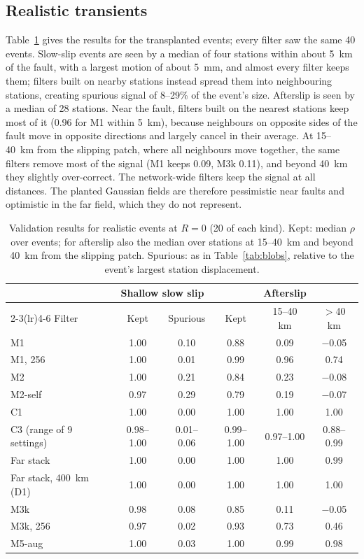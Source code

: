 \documentclass[11pt,a4paper]{article}
\begin{document}
\subsection{Realistic transients}

Table~\ref{tab:events} gives the results for the transplanted events; every filter saw the same 40 events. Slow-slip events are seen by a median of four stations within about 5~km of the fault, with a largest motion of about 5~mm, and almost every filter keeps them; filters built on nearby stations instead spread them into neighbouring stations, creating spurious signal of 8--29\% of the event's size. Afterslip is seen by a median of 28 stations. Near the fault, filters built on the nearest stations keep most of it (0.96 for M1 within 5~km), because neighbours on opposite sides of the fault move in opposite directions and largely cancel in their average. At 15--40~km from the slipping patch, where all neighbours move together, the same filters remove most of the signal (M1 keeps 0.09, M3k 0.11), and beyond 40~km they slightly over-correct. The network-wide filters keep the signal at all distances. The planted Gaussian fields are therefore pessimistic near faults and optimistic in the far field, which they do not represent.

\begin{table}[ht]
\centering
\small
\caption{Validation results for realistic events at $R = 0$ (20 of each kind). Kept: median $\rho$ over events; for afterslip also the median over stations at 15--40~km and beyond 40~km from the slipping patch. Spurious: as in Table~\ref{tab:blobs}, relative to the event's largest station displacement.}
\label{tab:events}
\begin{tabular}{lccccc}
\toprule
 & \multicolumn{2}{c}{Shallow slow slip} & \multicolumn{3}{c}{Afterslip} \\
\cmidrule(lr){2-3}\cmidrule(lr){4-6}
Filter & Kept & Spurious & Kept & 15--40 km & $>$40 km \\
\midrule
M1 & 1.00 & 0.10 & 0.88 & 0.09 & $-$0.05 \\
M1, 256 & 1.00 & 0.01 & 0.99 & 0.96 & 0.74 \\
M2 & 1.00 & 0.21 & 0.84 & 0.23 & $-$0.08 \\
M2-self & 0.97 & 0.29 & 0.79 & 0.19 & $-$0.07 \\
C1 & 1.00 & 0.00 & 1.00 & 1.00 & 1.00 \\
C3 (range of 9 settings) & 0.98--1.00 & 0.01--0.06 & 0.99--1.00 & 0.97--1.00 & 0.88--0.99 \\
Far stack & 1.00 & 0.00 & 1.00 & 1.00 & 0.99 \\
Far stack, 400~km (D1) & 1.00 & 0.00 & 1.00 & 1.00 & 1.00 \\
M3k & 0.98 & 0.08 & 0.85 & 0.11 & $-$0.05 \\
M3k, 256 & 0.97 & 0.02 & 0.93 & 0.73 & 0.46 \\
M5-aug & 1.00 & 0.03 & 1.00 & 0.99 & 0.98 \\
\bottomrule
\end{tabular}
\end{table}
\end{document}
